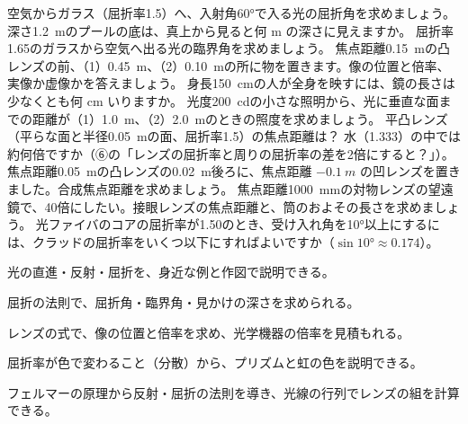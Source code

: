 \bkendproblems
{}
\bkproblem 空気からガラス（屈折率1.5）へ、入射角\ang{60}で入る光の屈折角を求めましょう。
\bkproblem 深さ\qty{1.2}{m}のプールの底は、真上から見ると何 m の深さに見えますか。
\bkproblem 屈折率1.65のガラスから空気へ出る光の臨界角を求めましょう。
\bkproblem 焦点距離\qty{0.15}{m}の凸レンズの前、（1）\qty{0.45}{m}、（2）\qty{0.10}{m}の所に物を置きます。像の位置と倍率、実像か虚像かを答えましょう。
\bkproblem 身長\qty{150}{cm}の人が全身を映すには、鏡の長さは少なくとも何 cm いりますか。
\bkproblem 光度\qty{200}{cd}の小さな照明から、光に垂直な面までの距離が（1）\qty{1.0}{m}、（2）\qty{2.0}{m}のときの照度を求めましょう。
\bkproblem 平凸レンズ（平らな面と半径\qty{0.05}{m}の面、屈折率1.5）の焦点距離は？ 水（1.333）の中では約何倍ですか（⑥の「レンズの屈折率と周りの屈折率の差を2倍にすると？」）。
\bkproblem 焦点距離\qty{0.05}{m}の凸レンズの\qty{0.02}{m}後ろに、焦点距離 $\qty{-0.1}{m}$ の凹レンズを置きました。合成焦点距離を求めましょう。
\bkproblem 焦点距離\qty{1000}{mm}の対物レンズの望遠鏡で、40倍にしたい。接眼レンズの焦点距離と、筒のおよその長さを求めましょう。
\bkproblem 光ファイバのコアの屈折率が1.50のとき、受け入れ角を\ang{10}以上にするには、クラッドの屈折率をいくつ以下にすればよいですか（$\sin\ang{10}\approx0.174$）。

\begin{furikaeri}
\begin{checklist}
\item 光の直進・反射・屈折を、身近な例と作図で説明できる。
\item 屈折の法則で、屈折角・臨界角・見かけの深さを求められる。
\item レンズの式で、像の位置と倍率を求め、光学機器の倍率を見積もれる。
\item 屈折率が色で変わること（分散）から、プリズムと虹の色を説明できる。
\item フェルマーの原理から反射・屈折の法則を導き、光線の行列でレンズの組を計算できる。
\end{checklist}
\end{furikaeri}
